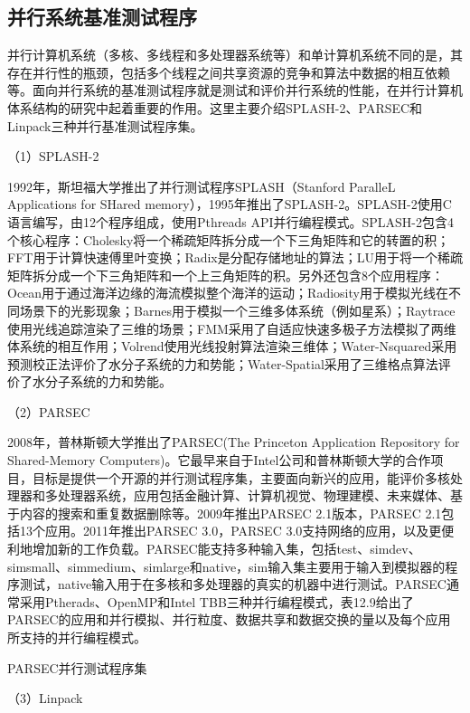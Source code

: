\documentclass[]{ctexbook}
\begin{document}
\hypertarget{ux5e76ux884cux7cfbux7edfux57faux51c6ux6d4bux8bd5ux7a0bux5e8f}{%
\subsection{并行系统基准测试程序}\label{ux5e76ux884cux7cfbux7edfux57faux51c6ux6d4bux8bd5ux7a0bux5e8f}}

并行计算机系统（多核、多线程和多处理器系统等）和单计算机系统不同的是，其存在并行性的瓶颈，包括多个线程之间共享资源的竞争和算法中数据的相互依赖等。面向并行系统的基准测试程序就是测试和评价并行系统的性能，在并行计算机体系结构的研究中起着重要的作用。这里主要介绍SPLASH-2、PARSEC和Linpack三种并行基准测试程序集。

（1）SPLASH-2

1992年，斯坦福大学推出了并行测试程序SPLASH（Stanford ParalleL Applications for SHared memory），1995年推出了SPLASH-2。SPLASH-2使用C语言编写，由12个程序组成，使用Pthreads API并行编程模式。SPLASH-2包含4个核心程序：Cholesky将一个稀疏矩阵拆分成一个下三角矩阵和它的转置的积；FFT用于计算快速傅里叶变换；Radix是分配存储地址的算法；LU用于将一个稀疏矩阵拆分成一个下三角矩阵和一个上三角矩阵的积。另外还包含8个应用程序：Ocean用于通过海洋边缘的海流模拟整个海洋的运动；Radiosity用于模拟光线在不同场景下的光影现象；Barnes用于模拟一个三维多体系统（例如星系）；Raytrace使用光线追踪渲染了三维的场景；FMM采用了自适应快速多极子方法模拟了两维体系统的相互作用；Volrend使用光线投射算法渲染三维体；Water-Nsquared采用预测校正法评价了水分子系统的力和势能；Water-Spatial采用了三维格点算法评价了水分子系统的力和势能。

（2）PARSEC

2008年，普林斯顿大学推出了PARSEC(The Princeton Application Repository for Shared-Memory Computers)。它最早来自于Intel公司和普林斯顿大学的合作项目，目标是提供一个开源的并行测试程序集，主要面向新兴的应用，能评价多核处理器和多处理器系统，应用包括金融计算、计算机视觉、物理建模、未来媒体、基于内容的搜索和重复数据删除等。2009年推出PARSEC 2.1版本，PARSEC 2.1包括13个应用。2011年推出PARSEC 3.0，PARSEC 3.0支持网络的应用，以及更便利地增加新的工作负载。PARSEC能支持多种输入集，包括test、simdev、simsmall、simmedium、simlarge和native，sim输入集主要用于输入到模拟器的程序测试，native输入用于在多核和多处理器的真实的机器中进行测试。PARSEC通常采用Ptherads、OpenMP和Intel TBB三种并行编程模式，表12.9给出了PARSEC的应用和并行模拟、并行粒度、数据共享和数据交换的量以及每个应用所支持的并行编程模式。

\label{tab:PARSEC}PARSEC并行测试程序集

（3）Linpack
\end{document}
